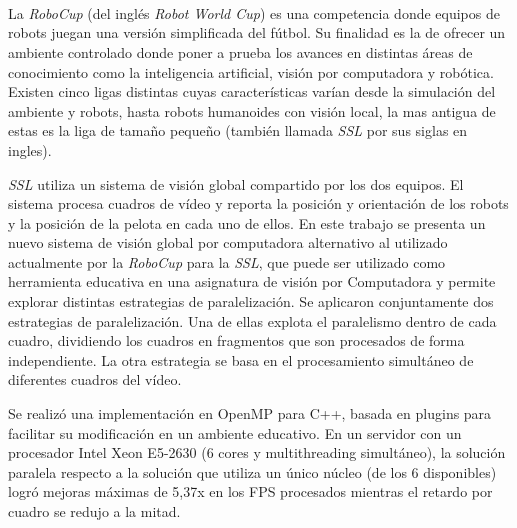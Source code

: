 \ \\
\ \\
\label{pagresum}
\\
\ \\
\ \\

\ \\

\ \\
\ \\

La \emph{RoboCup} (del inglés \emph{Robot World Cup}) es una competencia donde
equipos de robots juegan una versión simplificada del fútbol. Su finalidad es
la de ofrecer un ambiente controlado donde poner a prueba los avances en
distintas áreas de conocimiento como la inteligencia artificial, visión por
computadora y robótica. Existen cinco ligas distintas cuyas características
varían desde la simulación del ambiente y robots, hasta robots humanoides con
visión local, la mas antigua de estas es la liga de tamaño pequeño (también
llamada \emph{SSL} por sus siglas en ingles).

\emph{SSL} utiliza un sistema de visión global compartido por los dos equipos.
El sistema procesa cuadros de vídeo y reporta la posición y orientación de los
robots y la posición de la pelota en cada uno de ellos. En este trabajo se
presenta un nuevo sistema de visión global por computadora alternativo al
utilizado actualmente por la \emph{RoboCup} para la \emph{SSL}, que puede ser
utilizado como herramienta educativa en una asignatura de visión por
Computadora y permite explorar distintas estrategias de paralelización. Se
aplicaron conjuntamente dos estrategias de paralelización. Una de ellas
explota el paralelismo dentro de cada cuadro, dividiendo los cuadros en
fragmentos que son procesados de forma independiente. La otra estrategia se
basa en el procesamiento simultáneo de diferentes cuadros del vídeo.

Se realizó una implementación en OpenMP para C++, basada en plugins para
facilitar su modificación en un ambiente educativo. En un servidor con un
procesador Intel Xeon E5-2630 (6 cores y multithreading simultáneo), la
solución paralela respecto a la solución que utiliza un único núcleo (de los 6
disponibles) logró mejoras máximas de 5,37x en los FPS procesados mientras el
retardo por cuadro se redujo a la mitad.

\vfill
\pagebreak
